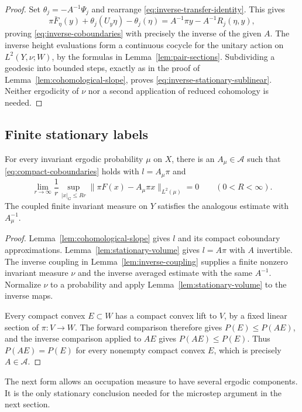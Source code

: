 \begin{proof}
Set $\theta_j=-A^{-1}\Psi_j$ and rearrange
\eqref{eq:inverse-transfer-identity}.  This gives
\[
 \pi\bar F_\eta(y)+\theta_j(U_y\eta)-\theta_j(\eta)
 =A^{-1}\pi y-A^{-1}R_j(\eta,y),
\]
proving \eqref{eq:inverse-coboundaries} with precisely the inverse
of the given $A$.  The inverse height evaluations form a continuous
cocycle for the unitary action on $L^2(Y,\nu;W)$, by the formulas
in Lemma~\ref{lem:pair-sections}.  Subdividing a geodesic into bounded
steps, exactly as in the proof of
Lemma~\ref{lem:cohomological-slope}, proves
\eqref{eq:inverse-stationary-sublinear}.  Neither ergodicity of $\nu$
nor a second application of reduced cohomology is needed.
\end{proof}

\subsection{Finite stationary labels}

\begin{proposition}\label{prop:stationary-slopes}
For every invariant ergodic probability $\mu$ on $X$, there is an
$A_\mu\in\mathcal A$ such that
\eqref{eq:compact-coboundaries} holds with $l=A_\mu\pi$ and
\[
 \lim_{r\to\infty}\frac1r\sup_{|x|_G\le Rr}
 \|\pi F(x)-A_\mu\pi x\|_{L^2(\mu)}=0
 \qquad(0<R<\infty).
\]
The coupled finite invariant measure on $Y$ satisfies the analogous
estimate with $A_\mu^{-1}$.
\end{proposition}

\begin{proof}
Lemma~\ref{lem:cohomological-slope} gives $l$ and its compact
coboundary approximations.  Lemma~\ref{lem:stationary-volume} gives
$l=A\pi$ with $A$ invertible.  The inverse coupling in
Lemma~\ref{lem:inverse-coupling} supplies a finite nonzero invariant
measure $\nu$ and the inverse averaged estimate with the same
$A^{-1}$.  Normalize $\nu$ to a probability and apply
Lemma~\ref{lem:stationary-volume} to the inverse maps.

Every compact convex $E\subset W$ has a compact convex lift to $V$,
by a fixed linear section of $\pi:V\to W$.  The forward comparison
therefore gives $P(E)\le P(AE)$, and the inverse comparison applied
to $AE$ gives $P(AE)\le P(E)$.  Thus $P(AE)=P(E)$ for every
nonempty compact convex $E$, which is precisely $A\in\mathcal A$.
\end{proof}

The next form allows an occupation measure to have several ergodic
components.  It is the only stationary conclusion needed for the
microstep argument in the next section.

